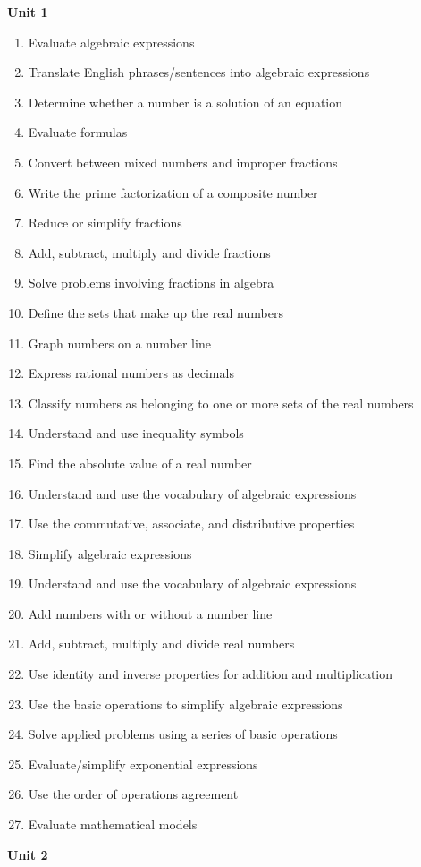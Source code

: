 \documentclass[11pt]{article}
\newenvironment{alphalist}{
\begin{enumerate}[label=(\arabic*),widest=107 ,leftmargin=25pt, itemsep=0pt]}
{\end{enumerate}}
\begin{document}
\noindent \textbf{Unit 1}
\begin{alphalist}
    \item Evaluate algebraic expressions
    \item Translate English phrases/sentences into algebraic expressions
    \item Determine whether a number is a solution of an equation
    \item Evaluate formulas
    \item Convert between mixed numbers and improper fractions
    \item Write the prime factorization of a composite number
    \item Reduce or simplify fractions
    \item Add, subtract, multiply and divide fractions
    \item Solve problems involving fractions in algebra
    \item Define the sets that make up the real numbers
    \item Graph numbers on a number line
    \item Express rational numbers as decimals
    \item Classify numbers as belonging to one or more sets of the real numbers
    \item Understand and use inequality symbols
    \item Find the absolute value of a real number
    \item Understand and use the vocabulary of algebraic expressions
    \item Use the commutative, associate, and distributive properties
    \item Simplify algebraic expressions
    \item Understand and use the vocabulary of algebraic expressions
    \item Add numbers with or without a number line
    \item Add, subtract, multiply and divide real numbers
    \item Use identity and inverse properties for addition and multiplication 
    \item Use the basic operations to simplify algebraic expressions 
    \item Solve applied problems using a series of basic operations
    \item Evaluate/simplify exponential expressions
    \item Use the order of operations agreement
    \item Evaluate mathematical models
\end{alphalist}
\noindent \textbf{Unit 2}
 
\end{document}
